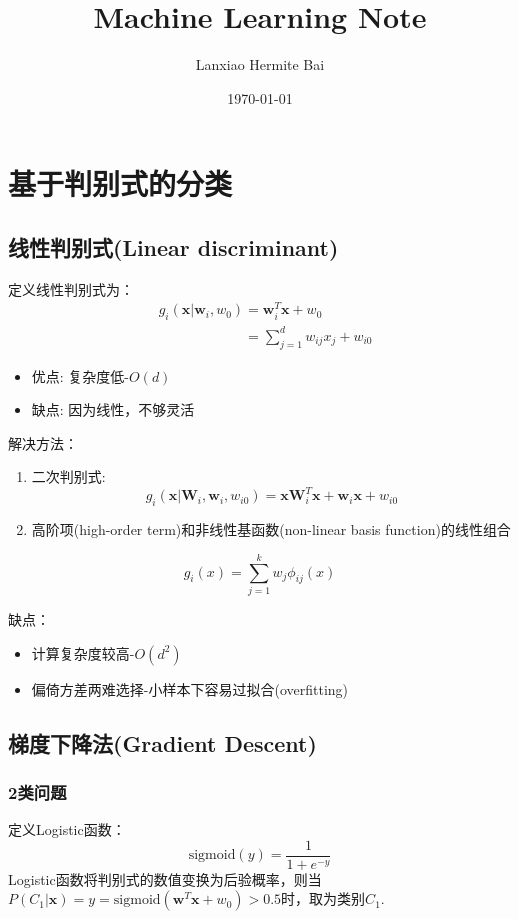\documentclass[11pt]{article}
\title{Machine Learning Note}
\author{Lanxiao Hermite Bai}
\date{\today}
\begin{document}
\maketitle
\newpage
\tableofcontents
\newpage

\section{基于判别式的分类}
\subsection{线性判别式(Linear discriminant)}
	定义线性判别式为：
	\begin{align}
		&g_i(\mathbf{x} | \mathbf{w}_i, w_0) = \mathbf{w}_i^T\mathbf{x} + w_0\nonumber\\
		&\phantom{g_i(\mathbf{x} | \mathbf{w}_i, w_0)} = \sum_{j = 1}^d w_{ij}x_j + w_{i0}\nonumber
	\end{align}
	\begin{itemize}
		\item 优点: 复杂度低-$O(d)$
		\item 缺点: 因为线性，不够灵活
	\end{itemize}
	
	解决方法：
	\begin{enumerate}
		\item 二次判别式: \[g_i(\mathbf{x} | \mathbf{W}_i, \mathbf{w}_i, w_{i0}) = \mathbf{x}\mathbf{W}^T_i\mathbf{x} + \mathbf{w}_i\mathbf{x} + w_{i0}\]
		\item 高阶项(high-order term)和非线性基函数(non-linear basis function)的线性组合
	\end{enumerate}
	
	\[g_i(x) = \sum_{j = 1}^k w_j\phi_{ij}(x)\]
	
	缺点：
	\begin{itemize}
		\item 计算复杂度较高-$O(d^2)$
		\item 偏倚方差两难选择-小样本下容易过拟合(overfitting)
	\end{itemize}
	\subsection{梯度下降法(Gradient Descent)}
	\subsubsection{2类问题}
		定义Logistic函数：
			\[\mathrm{sigmoid}(y) = \frac{1}{1 + e^{-y}}\]
		Logistic函数将判别式的数值变换为后验概率，则当$P(C_1 | \mathbf{x}) = y = \mathrm{sigmoid}(\mathbf{w}^T\mathbf{x} + w_0) > 0.5$时，取为类别$C_1$.
		
\end{document}
